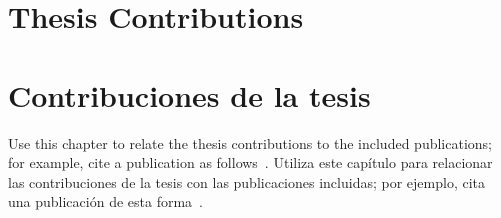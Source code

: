 %

{
  \chapter{Thesis Contributions}
}
{
  \chapter{Contribuciones de la tesis}
}
\label{cha:compendium-contributions}


  {Use this chapter to relate the thesis contributions to the included publications; for example, cite a publication as follows~\cite{garcia2026paper1}.}
  {Utiliza este capítulo para relacionar las contribuciones de la tesis con las publicaciones incluidas; por ejemplo, cita una publicación de esta forma~\cite{garcia2026paper1}.}








